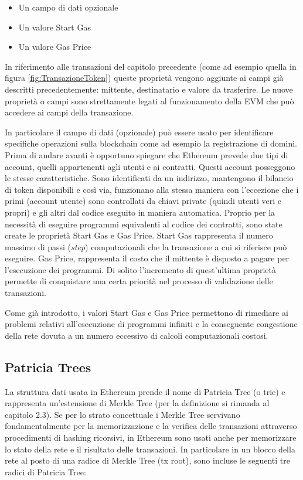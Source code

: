 \begin{itemize}
\item Un campo di dati opzionale
\item Un valore Start Gas
\item Un valore Gas Price
\end{itemize}

In riferimento alle transazioni del capitolo precedente (come ad esempio quella in figura \ref{fig:TransazioneToken}) queste proprietà vengono aggiunte ai campi già descritti precedentemente: mittente, destinatario e valore da trasferire. Le nuove proprietà o campi sono strettamente legati al funzionamento della EVM che può accedere ai campi della transazione.

In particolare il campo di dati (opzionale) può essere usato per identificare specifiche operazioni sulla blockchain come ad esempio la registrazione di domini. Prima di andare avanti è opportuno spiegare che Ethereum prevede due tipi di account, quelli appartenenti agli utenti e ai contratti. Questi account posseggono le stesse caratteristiche. Sono identificati da un indirizzo, mantengono il bilancio di token disponibili e così via, funzionano alla stessa maniera con l’eccezione che i primi (account utente) sono controllati da chiavi private (quindi utenti veri e propri) e gli altri dal codice eseguito in maniera automatica. Proprio per la necessità di eseguire programmi equivalenti al codice dei contratti, sono state create le proprietà Start Gas e Gas Price. Start Gas rappresenta il numero massimo di passi (\emph{step}) computazionali che la transazione a cui si riferisce può eseguire. Gas Price, rappresenta il costo che il mittente è disposto a pagare per l’esecuzione dei programmi. Di solito l’incremento di quest’ultima proprietà permette di conquistare una certa priorità nel processo di validazione delle transazioni.

Come già introdotto, i valori Start Gas e Gas Price permettono di rimediare ai problemi relativi all'esecuzione di programmi infiniti e la conseguente congestione della rete dovuta a un numero eccessivo di calcoli computazionali costosi.

\subsection{Patricia Trees}
La struttura dati usata in Ethereum prende il nome di Patricia Tree (o trie) e rappresenta un’estensione di Merkle Tree (per la definizione si rimanda al capitolo 2.3). Se per lo strato concettuale i Merkle Tree servivano fondamentalmente per la memorizzazione e la verifica delle transazioni attraverso procedimenti di hashing ricorsivi, in Ethereum sono usati anche per memorizzare lo stato della rete e il risultato delle transazioni. In particolare in un blocco della rete al posto di una radice di Merkle Tree (tx root), sono incluse le seguenti tre radici di Patricia Tree:

